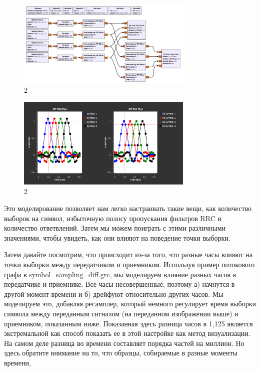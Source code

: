\documentclass[10pt,a4paper,oneside]{article}
\begin{document}
\begin{figure}[H]
        \centering
        \includegraphics[width=0.75\textwidth]{pics/6.png}
        \caption{2}
        \label{fig:first}
\end{figure}

\begin{figure}[H]
        \centering
        \includegraphics[width=0.75\textwidth]{pics/7.png}
        \caption{2}
        \label{fig:first}
\end{figure}

Это моделирование позволяет нам легко настраивать такие вещи, как количество выборок на символ, избыточную полосу пропускания фильтров RRC и количество ответвлений. Затем мы можем поиграть с этими различными значениями, чтобы увидеть, как они влияют на поведение точки выборки.

Затем давайте посмотрим, что происходит из-за того, что разные часы влияют на точки выборки между передатчиком и приемником. Используя пример потокового графа в symbol_sampling_diff.grc, мы моделируем влияние разных часов в передатчике и приемнике. Все часы несовершенные, поэтому а) начнутся в другой момент времени и б) дрейфуют относительно других часов. Мы моделируем это, добавляя ресамплер, который немного регулирует время выборки символа между переданным сигналом (на переданном изображении выше) и приемником, показанным ниже. Показанная здесь разница часов в 1,125 является экстремальной как способ показать ее в этой настройке как метод визуализации. На самом деле разница во времени составляет порядка частей на миллион. Но здесь обратите внимание на то, что образцы, собираемые в разные моменты времени,
\end{document}
